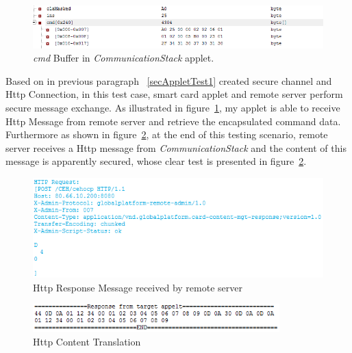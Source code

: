 \begin{figure}[!htb]
	\centering
	\includegraphics[width=1.2\textwidth]{Images/impl/cmd.png}
		\caption{\emph{cmd} Buffer in \emph{CommunicationStack} applet.}
	\label{fig:remote1}
\end{figure}

Based on in previous paragraph ~\ref{secAppletTest1} created secure channel and Http Connection, in this test case, smart card applet and remote server perform secure message exchange. As illustrated in figure~\ref{fig:remote1}, my applet is able to receive Http Message from remote server and retrieve the encapsulated command data. Furthermore as shown in figure~\ref{fig:remote2}, at the end of this testing scenario, remote server receives a Http message from \emph{CommunicationStack} and the content of this message is apparently secured, whose clear test is presented in figure~\ref{fig:remote2}.

\begin{figure}[!htb]
	\centering
	\includegraphics[width=1\textwidth]{Images/impl/http-msg.png}
		\caption{Http Response Message received by remote server}
	\label{fig:remote2}
\end{figure}

\begin{figure}[!htb]
	\centering
	\includegraphics[width=0.85\textwidth]{Images/impl/translate.png}
		\caption{Http Content Translation}
	\label{fig:remote3}
\end{figure}

